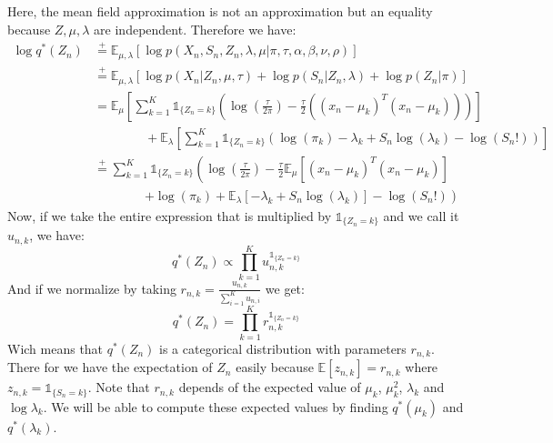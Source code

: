 \documentclass{article}
\begin{document}
Here, the mean field approximation is not an approximation but an equality because $Z, \mu, \lambda$ are independent. Therefore we have:
\begin{equation}
  \begin{split}
    \log q^*(Z_n) & \overset{+}{=} \mathbb{E}_{\mu,\lambda}[\log p(X_n,S_n,Z_n,\lambda,\mu|\pi,\tau,\alpha,\beta,\nu,\rho)]                                                                          \\
                  & \overset{+}{=} \mathbb{E}_{\mu,\lambda}[\log p(X_n|Z_n,\mu,\tau) + \log p(S_n|Z_n,\lambda) + \log p(Z_n|\pi)]                                                                    \\
                  & = \mathbb{E}_{\mu}\left[\sum_{k=1}^{K}\mathbb{1}_{\{Z_n = k\}}\left(\log \left(\frac{\tau}{2\pi}\right) -\frac{\tau}{2}\left((x_n - \mu_k)^T(x_n - \mu_k)\right)\right)\right]   \\
                  & \qquad\qquad + \mathbb{E}_{\lambda}\left[\sum_{k=1}^{K}\mathbb{1}_{\{Z_n = k\}}\left(\log(\pi_k) -\lambda_k + S_n\log(\lambda_k) - \log(S_n!)\right)\right]                      \\
                  & \overset{+}{=} \sum_{k=1}^{K}\mathbb{1}_{\{Z_n = k\}}\left(\log \left(\frac{\tau}{2\pi}\right) - \frac{\tau}{2}\mathbb{E}_{\mu}\left[(x_n - \mu_k)^T(x_n - \mu_k)\right] \right. \\
                  & \qquad\qquad \left. + \log(\pi_k) + \mathbb{E}_{\lambda}\left[-\lambda_k + S_n\log(\lambda_k)\right] - \log(S_n!)\right)
  \end{split}
\end{equation}
Now, if we take the entire expression that is multiplied by $\mathbb{1}_{\{Z_n = k\}}$ and we call it $u_{n,k}$, we have:
\begin{equation}
  q^*(Z_n) \propto \prod_{k=1}^{K}u_{n,k}^{\mathbb{1}_{\{Z_n = k\}}}
\end{equation}
And if we normalize by taking $r_{n,k} = \frac{u_{n,k}}{\sum_{i=1}^{K}u_{n,i}}$ we get:
\begin{equation}
  q^*(Z_n) = \prod_{k=1}^{K}r_{n,k}^{\mathbb{1}_{\{Z_n = k\}}}
\end{equation}
Wich means that $q^*(Z_n)$ is a categorical distribution with parameters $r_{n,k}$. There for we have the expectation of $Z_n$ easily because $\mathbb{E}[z_{n,k}] = r_{n,k}$ where $z_{n,k} = \mathbb{1}_{\{S_n = k\}}$. Note that $r_{n,k}$ depends of the expected value of $\mu_k$, $\mu_k^2$, $\lambda_k$ and $\log \lambda_k$. We will be able to compute these expected values by finding $q^*(\mu_k)$ and $q^*(\lambda_k)$.
\end{document}
